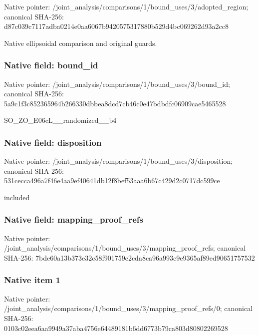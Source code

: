 \documentclass[10pt,a4paper]{article}
\begin{document}
Native pointer: /joint\_analysis/comparis\allowbreak{}ons/1/bound\_uses/3/adopt\allowbreak{}ed\_region; canonical SHA-256: d87c039c7117adba0214e0aa\allowbreak{}6067b9420575317880b529d4\allowbreak{}bc069262d93a2cc8


Native ellipsoidal comparison and original guards.


\subsubsection{Native field: bound\_id}


Native pointer: /joint\_analysis/comparis\allowbreak{}ons/1/bound\_uses/3/bound\allowbreak{}\_id; canonical SHA-256: 5a9c1f3c852365964b266330\allowbreak{}dbbea8dcd7cb46c0e47bdbdf\allowbreak{}c06909cae5465528


SO\_ZO\_E06cL\_\_randomized\_\_b4


\subsubsection{Native field: disposition}


Native pointer: /joint\_analysis/comparis\allowbreak{}ons/1/bound\_uses/3/dispo\allowbreak{}sition; canonical SHA-256: 531cecca496a7f46e4aa9ef4\allowbreak{}0641db12f8bef53aaa6b67c4\allowbreak{}29d2c0717dc599ce


included


\subsubsection{Native field: mapping\_proof\_refs}


Native pointer: /joint\_analysis/comparis\allowbreak{}ons/1/bound\_uses/3/mappi\allowbreak{}ng\_proof\_refs; canonical SHA-256: 7bde60a13b373e32c58f9017\allowbreak{}59e2cda8ca96a993c9e9365a\allowbreak{}f89ed90651757532



\subsubsection{Native item 1}


Native pointer: /joint\_analysis/comparis\allowbreak{}ons/1/bound\_uses/3/mappi\allowbreak{}ng\_proof\_refs/0; canonical SHA-256: 0103c02eea6aa9949a37aba4\allowbreak{}756e64489181b6dd6773b79c\allowbreak{}a803d80802269528
\end{document}
